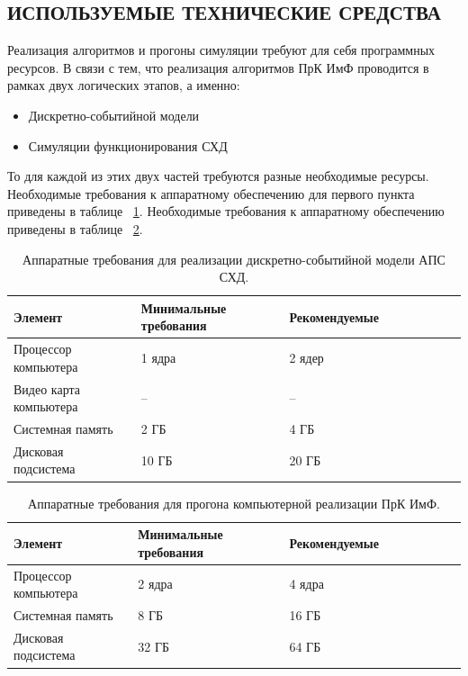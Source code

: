 \subsection{ИСПОЛЬЗУЕМЫЕ ТЕХНИЧЕСКИЕ СРЕДСТВА}

Реализация алгоритмов и прогоны симуляции требуют для себя программных ресурсов. В связи с тем, что реализация алгоритмов ПрК ИмФ проводится в рамках двух логических этапов, а именно:

\begin{itemize}
	\item Дискретно-событийной модели
	\item Симуляции функционирования СХД
\end{itemize}

То для каждой из этих двух частей требуются разные необходимые ресурсы. Необходимые требования к аппаратному обеспечению для первого пункта приведены в таблице ~\ref{tab:req1}. Необходимые требования к аппаратному обеспечению приведены в таблице ~\ref{tab:req2}.

\begin{table}[h!]
	\begin{center}
		\begin{tabular}{ | l | l | l | l | l |l |l |l |l |}
			\hline
			Элемент & Минимальные требования & Рекомендуемые \\ \hline
			Процессор компьютера & 1 ядра & 2 ядер \\ \hline
			Видео карта компьютера & -- & -- \\ \hline
			Системная память & 2 ГБ &  4 ГБ \\ \hline
			Дисковая подсистема & 10 ГБ & 20 ГБ  \\ \hline
		\end{tabular}
	\end{center}
	\caption{Аппаратные требования для реализации дискретно-событийной модели АПС СХД.}
	\label{tab:req1}
\end{table}


\begin{table}[h!]
	\begin{center}
		\begin{tabular}{ | l | l | l | l | l |l |l |l |l |}
			\hline
			Элемент & Минимальные требования & Рекомендуемые \\ \hline
			Процессор компьютера & 2 ядра & 4 ядра \\ \hline
			Системная память & 8 ГБ &  16 ГБ \\ \hline
			Дисковая подсистема & 32 ГБ & 64 ГБ  \\ \hline
		\end{tabular}
	\end{center}
	\caption{Аппаратные требования для прогона компьютерной реализации ПрК ИмФ.}
	\label{tab:req2}
\end{table}

